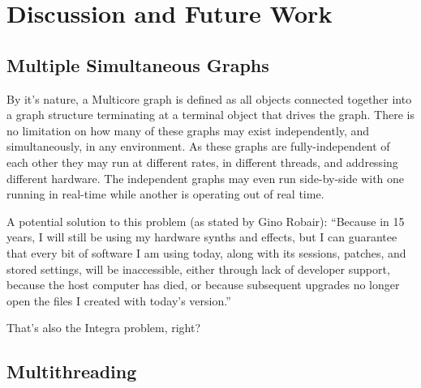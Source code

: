 \documentclass[twoside,a4paper]{article}
\begin{document}
\section{Discussion and Future Work} %

\subsection{Multiple Simultaneous Graphs} %

By it's nature, a Multicore graph is defined as all objects connected together into a graph structure terminating at a terminal object that drives the graph.  There is no limitation on how many of these graphs may exist independently, and simultaneously, in any environment.  As these graphs are fully-independent of each other they may run at different rates, in different threads, and addressing different hardware.  The independent graphs may even run side-by-side with one running in real-time while another is operating out of real time.


A potential solution to this problem (as stated by Gino Robair):
``Because in 15 years, I will still be using my hardware synths and effects,
but I can guarantee that every bit of software I am using today, along with its sessions,
patches,
and stored settings,
will be inaccessible,
either through lack of developer support, because the host computer has died, 
or because subsequent upgrades no longer open the files I created with today's version.''

That's also the Integra problem, right?





\subsection{Multithreading} %
\end{document}
